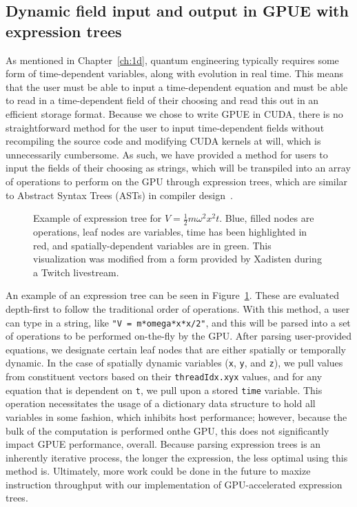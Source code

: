 \subsection{Dynamic field input and output in GPUE with expression trees}

As mentioned in Chapter~\ref{ch:1d}, quantum engineering typically requires some form of time-dependent variables, along with evolution in real time.
This means that the user must be able to input a time-dependent equation and must be able to read in a time-dependent field of their choosing and read this out in an efficient storage format.
Because we chose to write GPUE in CUDA, there is no straightforward method for the user to input time-dependent fields without recompiling the source code and modifying CUDA kernels at will, which is unnecessarily cumbersome.
As such, we have provided a method for users to input the fields of their choosing as strings, which will be transpiled into an array of operations to perform on the GPU through expression trees, which are similar to Abstract Syntax Trees (ASTs) in compiler design~\cite{cohen1991, reyes2011}.

\begin{figure}
\center 
\caption{
Example of expression tree for $V=\frac{1}{2}m \omega^2 x^2 t$.
Blue, filled nodes are operations, leaf nodes are variables, time has been highlighted in red, and spatially-dependent variables are in green.
This visualization was modified from a form provided by Xadisten during a Twitch livestream.
}
\label{fig:expr_tree}
\end{figure}

An example of an expression tree can be seen in Figure~\ref{fig:expr_tree}.
These are evaluated depth-first to follow the traditional order of operations.
With this method, a user can type in a string, like \texttt{"V = m*omega*x*x/2"}, and this will be parsed into a set of operations to be performed on-the-fly by the GPU.
After parsing user-provided equations, we designate certain leaf nodes that are either spatially or temporally dynamic.
In the case of spatially dynamic variables (\texttt{x}, \texttt{y}, and \texttt{z}), we pull values from constituent vectors based on their \texttt{threadIdx.xyx} values, and for any equation that is dependent on \texttt{t}, we pull upon a stored \texttt{time} variable.
This operation necessitates the usage of a dictionary data structure to hold all variables in some fashion, which inhibits host performance; however, because the bulk of the computation is performed onthe GPU, this does not significantly impact GPUE performance, overall.
Because parsing expression trees is an inherently iterative process, the longer the expression, the less optimal using this method is.
Ultimately, more work could be done in the future to maxize instruction throughput with our implementation of GPU-accelerated expression trees.

